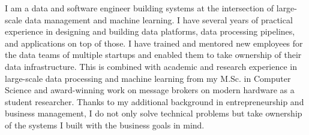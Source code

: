 

\begin{cvparagraph}


I am a data and software engineer building systems at the intersection of large-scale data management and machine learning. 
I have several years of practical experience in designing and building data platforms, data processing pipelines, and applications on top of those. 
I have trained and mentored new employees for the data teams of multiple startups and enabled them to take ownership of their data infrastructure.
This is combined with academic and research experience in large-scale data processing and machine learning from my M.Sc. in Computer Science and award-winning work on message brokers on modern hardware as a student researcher.
Thanks to my additional background in entrepreneurship and business management, I do not only solve technical problems but take ownership of the systems I built with the business goals in mind. 
\end{cvparagraph}
